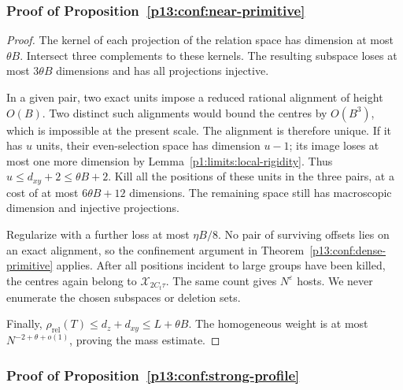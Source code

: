 \subsubsection{Proof of Proposition~\ref{p13:conf:near-primitive}}
\label{p14:comp:confinement:near}

\begin{proof}
The kernel of each projection of the relation space
has dimension at most \(\theta B\).
Intersect three complements to these kernels.
The resulting subspace loses at most \(3\theta B\)
dimensions and has all projections injective.

In a given pair, two exact units impose a reduced rational
alignment of height \(O(B)\). Two distinct such alignments
would bound the centres by \(O(B^3)\), which is impossible
at the present scale. The alignment is therefore unique.
If it has \(u\) units, their even-selection space has
dimension \(u-1\); its image loses at most one more
dimension by Lemma~\ref{p1:limits:local-rigidity}.
Thus \(u\le d_{xy}+2\le\theta B+2\).
Kill all the positions of these units in the three pairs,
at a cost of at most \(6\theta B+12\) dimensions.
The remaining space still has macroscopic dimension
and injective projections.

Regularize with a further loss at most \(\eta B/8\).
No pair of surviving offsets lies on an exact alignment,
so the confinement argument in
Theorem~\ref{p13:conf:dense-primitive} applies.
After all positions incident to large groups have been
killed, the centres again belong to
\(\mathcal X_{2C_t\tau}\).
The same count gives \(N^\varepsilon\) hosts.
We never enumerate the chosen subspaces or deletion sets.

Finally,
\(\rho_{\mathrm{rel}}(T)\le d_z+d_{xy}\le L+\theta B\).
The homogeneous weight is at most
\(N^{-2+\theta+o(1)}\), proving the mass estimate.
\end{proof}

\subsubsection{Proof of Proposition~\ref{p13:conf:strong-profile}}
\label{p14:comp:confinement:strong}

